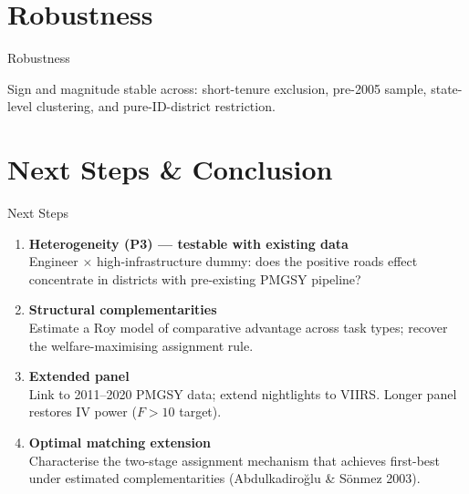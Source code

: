 \documentclass[aspectratio=169,10pt]{beamer}
\begin{document}
\section{Robustness}

\begin{frame}{Robustness}
  \begin{center}
  \end{center}
  \vspace{4pt}
  {\footnotesize \color{iasgray}
  Sign and magnitude stable across: short-tenure exclusion, pre-2005 sample,
  state-level clustering, and pure-ID-district restriction.}
\end{frame}

\section{Next Steps \& Conclusion}

\begin{frame}{Next Steps}
  \begin{enumerate}\setlength\itemsep{8pt}
    \item \textbf{Heterogeneity (P3) — testable with existing data}\\
          Engineer $\times$ high-infrastructure dummy:
          does the positive roads effect concentrate in districts
          with pre-existing PMGSY pipeline?
    \item \textbf{Structural complementarities}\\
          Estimate a Roy model of comparative advantage across task types;
          recover the welfare-maximising assignment rule.
    \item \textbf{Extended panel}\\
          Link to 2011--2020 PMGSY data; extend nightlights to VIIRS.
          Longer panel restores IV power ($F > 10$ target).
    \item \textbf{Optimal matching extension}\\
          Characterise the two-stage assignment mechanism that achieves
          first-best under estimated complementarities
          (Abdulkadiro\u{g}lu \& S\"onmez 2003).
  \end{enumerate}
\end{frame}
\end{document}
